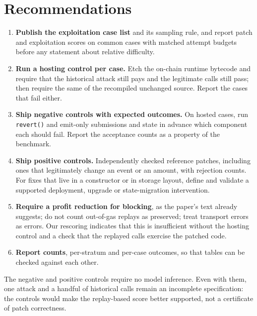 \documentclass[conference]{IEEEtran}
\newcommand{\code}[1]{\texttt{#1}}
\begin{document}
\section{Recommendations}
\begin{enumerate}
\item \textbf{Publish the exploitation case list} and its sampling rule, and report patch and exploitation scores on common cases with matched attempt budgets before any statement about relative difficulty.
\item \textbf{Run a hosting control per case.} Etch the on-chain runtime bytecode and require that the historical attack still pays and the legitimate calls still pass; then require the same of the recompiled unchanged source. Report the cases that fail either.
\item \textbf{Ship negative controls with expected outcomes.} On hosted cases, run \code{revert()} and emit-only submissions and state in advance which component each should fail. Report the acceptance counts as a property of the benchmark.
\item \textbf{Ship positive controls.} Independently checked reference patches, including ones that legitimately change an event or an amount, with rejection counts. For fixes that live in a constructor or in storage layout, define and validate a supported deployment, upgrade or state-migration intervention.
\item \textbf{Require a profit reduction for blocking}, as the paper's text already suggests; do not count out-of-gas replays as preserved; treat transport errors as errors. Our rescoring indicates that this is insufficient without the hosting control and a check that the replayed calls exercise the patched code.
\item \textbf{Report counts}, per-stratum and per-case outcomes, so that tables can be checked against each other.
\end{enumerate}
The negative and positive controls require no model inference. Even with them, one attack and a handful of historical calls remain an incomplete specification: the controls would make the replay-based score better supported, not a certificate of patch correctness.
\end{document}
